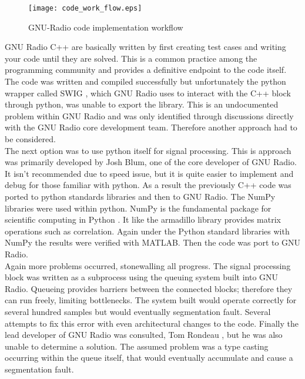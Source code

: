\begin{figure}[!ht] 
\centering
\texttt{[image: code\_work\_flow.eps]}
\caption{GNU-Radio code implementation workflow}
\end{figure}

GNU Radio C++ are basically written by first creating test cases and writing your code until they are solved.  This is a common practice among the programming community and provides a definitive endpoint to the code itself.  The code was written and compiled successfully but unfortunately the python wrapper called SWIG \cite{swig}, which GNU Radio uses to interact with the C++ block through python, was unable to export the library.  This is an undocumented problem within GNU Radio and was only identified through discussions directly with the GNU Radio core development team.  Therefore another approach had to be considered.\\

The next option was to use python itself for signal processing.  This is approach was primarily developed by Josh Blum, one of the core developer of GNU Radio.  It isn't recommended due to speed issue, but it is quite easier to implement and debug for those familiar with python.  As a result the previously C++ code was ported to python standards libraries and then to GNU Radio.  The NumPy libraries were used within python.  NumPy is the fundamental package for scientific computing in Python \cite{numpy}.  It like the armadillo library provides matrix operations such as correlation.  Again under the Python standard libraries with NumPy the results were verified with MATLAB.  Then the code was port to GNU Radio.\\

Again more problems occurred, stonewalling all progress.  The signal processing block was written as a subprocess using the queuing system built into GNU Radio.  Queueing provides barriers between the connected blocks; therefore they can run freely, limiting bottlenecks. The system built would operate correctly for several hundred samples but would eventually segmentation fault.  Several attempts to fix this error with even architectural changes to the code.  Finally the lead developer of GNU Radio was consulted, Tom Rondeau \cite{tomrondeau}, but he was also unable to determine a solution.  The assumed problem was a type casting occurring within the queue itself, that would eventually accumulate and cause a segmentation fault.\\

